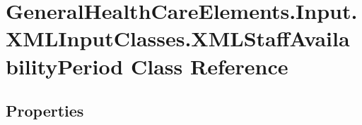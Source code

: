 \hypertarget{class_general_health_care_elements_1_1_input_1_1_x_m_l_input_classes_1_1_x_m_l_staff_availability_period}{}\section{General\+Health\+Care\+Elements.\+Input.\+X\+M\+L\+Input\+Classes.\+X\+M\+L\+Staff\+Availability\+Period Class Reference}
\label{class_general_health_care_elements_1_1_input_1_1_x_m_l_input_classes_1_1_x_m_l_staff_availability_period}
\subsection*{Properties}
